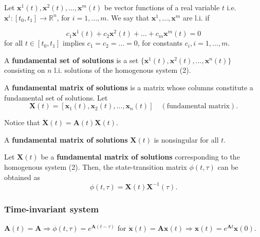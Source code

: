 \begin{definition}[l.i. functions]
    Let \(\mathbf{x}^{1}(t), \mathbf{x}^{2}(t), \ldots , \mathbf{x}^{m}(t)\) be vector functions of a real variable \(t\) i.e.~\(\mathbf{x}^{i}: [t_{0}, t_{1}] \to \mathbb{R}^{n}\), for \(i = 1, \ldots , m\). We say that \(\mathbf{x}^{1}, \ldots , \mathbf{x}^{m}\) are l.i. if

    \[
        c_{1} \mathbf{x}^{1}(t) + c_{2} \mathbf{x}^{2}(t) + \dots + c_{m} \mathbf{x}^{m}(t) = 0
    \]
    for all \(t \in [t_{0}, t_{1}]\) implies \(c_{1} = c_{2} = \dots = 0\), for constants \(c_{i}, i = 1, \ldots , m\).
\end{definition}

\begin{definition}
    A \textbf{fundamental set of solutions} is a set \(\{\mathbf{x}^{1}(t), \mathbf{x}^{2}(t), \ldots , \mathbf{x}^{n}(t)\}\) consisting on \(n\) l.i. solutions of the homogenous system (2).
\end{definition}

\begin{definition}
    A \textbf{fundamental matrix of solutions} is a matrix whose
    columns constitute a fundamental set of solutions. Let
    \[
        \mathbf{X}(t) = [\mathbf{x}_1(t),\mathbf{x}_2(t),\dots,\mathbf{x}_n(t)] \quad (\text{fundamental matrix}).
    \]

    Notice that \(\dot{\mathbf{X}} (t) = \mathbf{A}(t)\mathbf{X}(t)\).
\end{definition}

\begin{proposition}
    A \textbf{fundamental matrix of solutions} \(\mathbf{X}(t)\) is nonsingular for all \(t\).
\end{proposition}

\begin{proposition}
    Let \(\mathbf{X}(t)\) be a \textbf{fundamental matrix of solutions} corresponding to the homogenous system (2). Then, the state-transition matrix \(\phi (t, \tau)\) can be obtained as
    \[
        \phi (t, \tau) = \mathbf{X}(t) \mathbf{X}^{-1}(\tau).
    \]
\end{proposition}

\subsubsection{Time-invariant system} $\mathbf{A}(t) = \mathbf{A} \Longrightarrow \phi (t, \tau) = e^{\mathbf{A}(t - \tau)}$ for $\dot{\mathbf{x}} (t) = \mathbf{A} \mathbf{x}(t) \Longrightarrow \mathbf{x}(t) = e^{\mathbf{A}t}\mathbf{x}(0)$.

